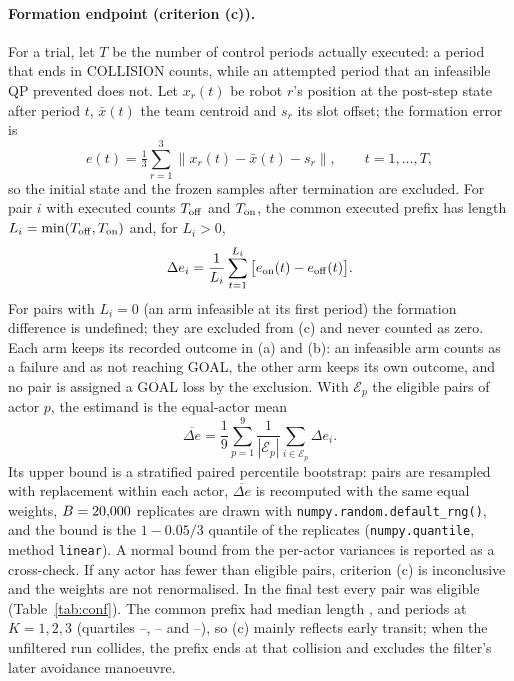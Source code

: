 \documentclass[journal]{IEEEtran}
\begin{document}
\paragraph{Formation endpoint (criterion (c)).} For a trial, let $T$ be the number of control
periods actually executed: a period that ends in COLLISION counts, while an attempted period that an
infeasible QP prevented does not. Let $x_r(t)$ be robot $r$'s position at the post-step state after
period $t$, $\bar x(t)$ the team centroid and $s_r$ its slot offset; the formation error is
\begin{equation}
e(t)=\tfrac13\textstyle\sum_{r=1}^{3}\big\|x_r(t)-\bar x(t)-s_r\big\|,\qquad t=1,\dots,T,
\end{equation}
so the initial state and the frozen samples after termination are excluded. For pair $i$ with
executed counts $T_{\rm off}$ and $T_{\rm on}$, the common executed prefix has length
$L_i=\min(T_{\rm off},T_{\rm on})$ and, for $L_i>0$,
\begin{equation}
\Delta e_i=\frac1{L_i}\sum_{t=1}^{L_i}\big[e_{\rm on}(t)-e_{\rm off}(t)\big].
\end{equation}
For pairs with $L_i=0$ (an arm infeasible at its first period) the formation difference is undefined;
they are excluded from (c) and never counted as zero. Each arm keeps its recorded outcome in (a) and
(b): an infeasible arm counts as a failure and as not reaching GOAL, the other arm keeps its own
outcome, and no pair is assigned a GOAL loss by the exclusion. With $\mathcal E_p$
the eligible pairs of actor $p$, the estimand is the equal-actor mean
\begin{equation}
\overline{\Delta e}=\frac19\sum_{p=1}^{9}\frac1{|\mathcal E_p|}\sum_{i\in\mathcal E_p} \Delta e_i .
\end{equation}
Its upper bound is a stratified paired percentile bootstrap: pairs are resampled with replacement
within each actor, $\overline{\Delta e}$ is recomputed with the same equal weights, $B=20{,}000$ replicates are
drawn with \texttt{numpy.random.default\_rng(\BootSeed)}, and the bound is the $1-0.05/3$ quantile of
the replicates (\texttt{numpy.quantile}, method \texttt{linear}). A normal bound from the per-actor
variances is reported as a cross-check. If any actor has fewer than \MinEligible{} eligible pairs,
criterion (c) is inconclusive and the weights are not renormalised. In the final test every pair was
eligible (Table~\ref{tab:conf}). The common prefix had median length \LMedone, \LMedtwo{} and
\LMedthree{} periods at $K=1,2,3$ (quartiles \LQloone--\LQhione, \LQlotwo--\LQhitwo{} and
\LQlothree--\LQhithree), so (c) mainly reflects early transit; when the unfiltered run collides, the
prefix ends at that collision and excludes the filter's later avoidance manoeuvre.
\end{document}
